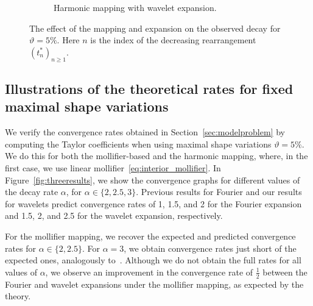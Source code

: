\begin{figure}
\begin{subfigure}[t]{0.47\textwidth}
		\caption{Harmonic mapping with wavelet expansion.}
	\end{subfigure}
	\caption{The effect of the mapping and expansion on the observed decay for $\vartheta=5\%$. Here $n$ is the index of the decreasing rearrangement $(t^*_n)_{n \geq 1}$.\reprintpermissionfootnote}
	\label{fig:squareresults}
\end{figure}
\fi

\subsection{Illustrations of the theoretical rates for fixed maximal shape variations}
\label{subsec:vartheta5percent}

We verify the convergence rates obtained in Section~\ref{sec:modelproblem} by computing the Taylor coefficients when using maximal shape variations $\vartheta=5\%$.
We do this for both the mollifier-based and the harmonic mapping, where, in the first case, we use linear mollifier~\eqref{eq:interior_mollifier}.
In Figure~\ref{fig:threeresults}, we show the convergence graphs for different values of the decay rate $\alpha$, for $\alpha\in \{2, 2.5, 3\}$.
Previous results for Fourier and our results for wavelets predict convergence rates of 1, 1.5, and 2 for the Fourier expansion and 1.5, 2, and 2.5 for the wavelet expansion, respectively.

For the mollifier mapping, we recover the expected and predicted convergence rates for $\alpha\in\{2, 2.5\}$.
For $\alpha=3$, we obtain convergence rates just short of the expected ones, analogously to~\cite{bachmayr2017a}.
Although we do not obtain the full rates for all values of $\alpha$, we observe an improvement in the convergence rate of $\frac{1}{2}$ between the Fourier and wavelet expansions under the mollifier mapping, as expected by the theory.

